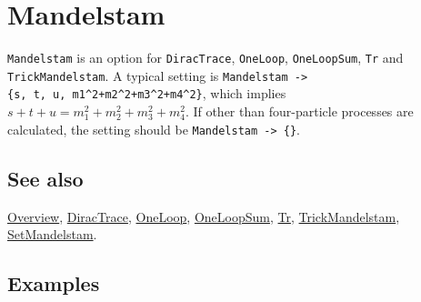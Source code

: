 \documentclass[../FeynCalcManual.tex]{subfiles}
\begin{document}
\hypertarget{mandelstam}{%
\section{Mandelstam}\label{mandelstam}}

\texttt{Mandelstam} is an option for \texttt{DiracTrace},
\texttt{OneLoop}, \texttt{OneLoopSum}, \texttt{Tr} and
\texttt{TrickMandelstam}. A typical setting is
\texttt{Mandelstam -> \{\allowbreak{}s,\ \allowbreak{}t,\ \allowbreak{}u,\ \allowbreak{}m1^2+m2^2+m3^2+m4^2\}},
which implies \(s + t + u = m_1^2+m_2^2+m_3^2+m_4^2\). If other than
four-particle processes are calculated, the setting should be
\texttt{Mandelstam -> \{\allowbreak{}\}}.

\subsection{See also}

\hyperlink{toc}{Overview}, \hyperlink{diractrace}{DiracTrace},
\hyperlink{oneloop}{OneLoop}, \hyperlink{oneloopsum}{OneLoopSum},
\hyperlink{tr}{Tr}, \hyperlink{trickmandelstam}{TrickMandelstam},
\hyperlink{setmandelstam}{SetMandelstam}.

\subsection{Examples}
\end{document}
